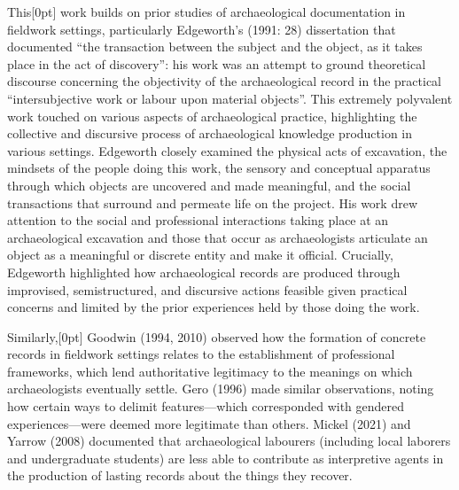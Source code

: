 \documentclass[
]{article}
\newcommand{\paragraphnumber}[1]{\marginnote{\color{lightgray}\tiny{#1}}[0pt]}
\begin{document}
This\paragraphnumber{[4]} work builds on prior studies of archaeological
documentation in fieldwork settings, particularly Edgeworth's (1991: 28)
dissertation that documented ``the transaction between the subject and
the object, as it takes place in the act of discovery'': his work was an
attempt to ground theoretical discourse concerning the objectivity of
the archaeological record in the practical ``intersubjective work or
labour upon material objects''. This extremely polyvalent work touched
on various aspects of archaeological practice, highlighting the
collective and discursive process of archaeological knowledge production
in various settings. Edgeworth closely examined the physical acts of
excavation, the mindsets of the people doing this work, the sensory and
conceptual apparatus through which objects are uncovered and made
meaningful, and the social transactions that surround and permeate life
on the project. His work drew attention to the social and professional
interactions taking place at an archaeological excavation and those that
occur as archaeologists articulate an object as a meaningful or discrete
entity and make it official. Crucially, Edgeworth highlighted how
archaeological records are produced through improvised, semistructured,
and discursive actions feasible given practical concerns and limited by
the prior experiences held by those doing the work.

Similarly,\paragraphnumber{[5]} Goodwin (1994, 2010) observed how the
formation of concrete records in fieldwork settings relates to the
establishment of professional frameworks, which lend authoritative
legitimacy to the meanings on which archaeologists eventually settle.
Gero (1996) made similar observations, noting how certain ways to
delimit features---which corresponded with gendered experiences---were
deemed more legitimate than others. Mickel (2021) and Yarrow (2008)
documented that archaeological labourers (including local laborers and
undergraduate students) are less able to contribute as interpretive
agents in the production of lasting records about the things they
recover.
\end{document}
